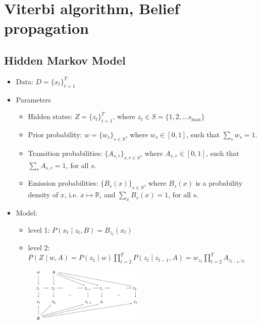\clearpage
\section{Viterbi algorithm, Belief propagation}

\subsection{Hidden Markov Model}
\begin{itemize}
	\item Data: $D = \{x_t\}_{t=1}^T$
	\item Parameters
	\begin{itemize}
		\item Hidden states: $Z = \{z_t\}_{t=1}^T$, where $z_t \in S = \{1,2,\ldots s_\text{max}\}$
		\item Prior probability: $w = \{w_s\}_{s\in S}$, where $w_s \in [0,1]$, such that $\sum_s w_s = 1$.
		\item Transition probabilities: $\{A_{s, r}\}_{s,r\in S}$, where $A_{s,r} \in [0,1]$, such that $\sum_r A_{s,r} = 1$, for all $s$.
		\item Emission probabilities: $\{B_s(x)\}_{s\in S}$, where $B_s(x)$ is a probability density of $x$, i.e. $x\mapsto \mathds{R}$, and $\sum_x B_s(x) = 1$, for all $s$.
	\end{itemize}
	\item Model:
	\begin{itemize}
		\item level 1: $P(x_t\;|\;z_t, B) = B_{z_t}(x_t)$
		\item level 2: $P(Z\;|\;w, A) = P(z_1\;|\; w) \prod_{t=2}^T P(z_t\;|\;z_{t-1}, A) = w_{z_1} \prod_{t=2}^T A_{z_{t-1}, z_{t}}$
	\end{itemize}
	\begin{figure}[h]
	\centering
		\includegraphics[width=0.5\textwidth]{./figs/09-HMM.pdf}
	\end{figure}


\end{itemize}
